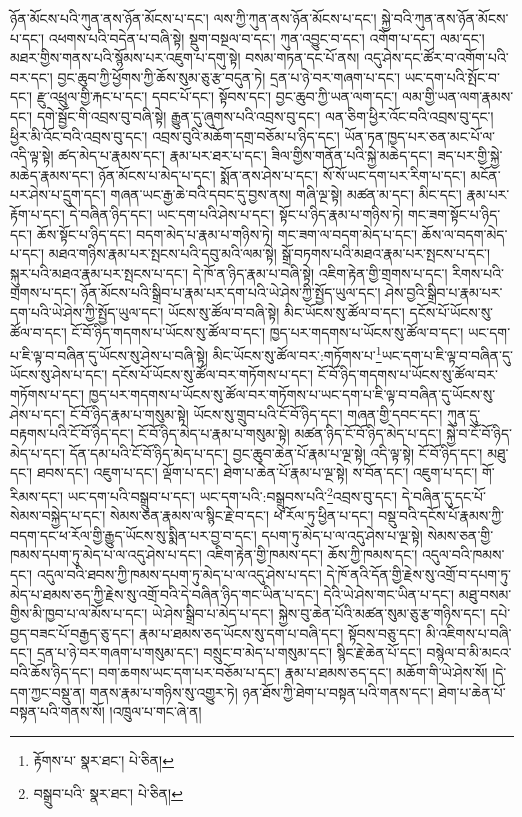 ཉོན་མོངས་པའི་ཀུན་ནས་ཉོན་མོངས་པ་དང་། ལས་ཀྱི་ཀུན་ནས་ཉོན་མོངས་པ་དང་། སྐྱེ་བའི་ཀུན་ནས་ཉོན་མོངས་པ་དང་། འཕགས་པའི་བདེན་པ་བཞི་སྟེ། སྡུག་བསྔལ་བ་དང་། ཀུན་འབྱུང་བ་དང་། འགོག་པ་དང་། ལམ་དང་། མཐར་གྱིས་གནས་པའི་སྙོམས་པར་འཇུག་པ་དགུ་སྟེ། བསམ་གཏན་དང་པོ་ནས། འདུ་ཤེས་དང་ཚོར་བ་འགོག་པའི་བར་དང་། བྱང་ཆུབ་ཀྱི་ཕྱོགས་ཀྱི་ཆོས་སུམ་ཅུ་རྩ་བདུན་ཏེ། དྲན་པ་ཉེ་བར་གཞག་པ་དང་། ཡང་དག་པའི་སྤོང་བ་དང་། རྫུ་འཕྲུལ་གྱི་རྐང་པ་དང་། དབང་པོ་དང་། སྟོབས་དང་། བྱང་ཆུབ་ཀྱི་ཡན་ལག་དང་། ལམ་གྱི་ཡན་ལག་རྣམས་དང་། དགེ་སྦྱོང་གི་འབྲས་བུ་བཞི་སྟེ། རྒྱུན་དུ་ཞུགས་པའི་འབྲས་བུ་དང་། ལན་ཅིག་ཕྱིར་འོང་བའི་འབྲས་བུ་དང་། ཕྱིར་མི་འོང་བའི་འབྲས་བུ་དང་། འབྲས་བུའི་མཆོག་དགྲ་བཅོམ་པ་ཉིད་དང་། ཡོན་ཏན་ཁྱད་པར་ཅན་མང་པོ་ལ་འདི་ལྟ་སྟེ། ཚད་མེད་པ་རྣམས་དང་། རྣམ་པར་ཐར་པ་དང་། ཟིལ་གྱིས་གནོན་པའི་སྐྱེ་མཆེད་དང་། ཟད་པར་གྱི་སྐྱེ་མཆེད་རྣམས་དང་། ཉོན་མོངས་པ་མེད་པ་དང་། སྨོན་ནས་ཤེས་པ་དང་། སོ་སོ་ཡང་དག་པར་རིག་པ་དང་། མངོན་པར་ཤེས་པ་དྲུག་དང་། གཞན་ཡང་རྒྱ་ཆེ་བའི་དབང་དུ་བྱས་ནས། གཞི་ལྔ་སྟེ། མཚན་མ་དང་། མིང་དང་། རྣམ་པར་རྟོག་པ་དང་། དེ་བཞིན་ཉིད་དང་། ཡང་དག་པའི་ཤེས་པ་དང་། སྟོང་པ་ཉིད་རྣམ་པ་གཉིས་ཏེ། གང་ཟག་སྟོང་པ་ཉིད་དང་། ཆོས་སྟོང་པ་ཉིད་དང་། བདག་མེད་པ་རྣམ་པ་གཉིས་ཏེ། གང་ཟག་ལ་བདག་མེད་པ་དང་། ཆོས་ལ་བདག་མེད་པ་དང་། མཐའ་གཉིས་རྣམ་པར་སྤངས་པའི་དབུ་མའི་ལམ་སྟེ། སྒྲོ་བཏགས་པའི་མཐའ་རྣམ་པར་སྤངས་པ་དང་། སྐུར་པའི་མཐའ་རྣམ་པར་སྤངས་པ་དང་། དེ་ཁོ་ན་ཉིད་རྣམ་པ་བཞི་སྟེ། འཇིག་རྟེན་གྱི་གྲགས་པ་དང་། རིགས་པའི་གྲགས་པ་དང་། ཉོན་མོངས་པའི་སྒྲིབ་པ་རྣམ་པར་དག་པའི་ཡེ་ཤེས་ཀྱི་སྤྱོད་ཡུལ་དང་། ཤེས་བྱའི་སྒྲིབ་པ་རྣམ་པར་དག་པའི་ཡེ་ཤེས་ཀྱི་སྤྱོད་ཡུལ་དང་། ཡོངས་སུ་ཚོལ་བ་བཞི་སྟེ། མིང་ཡོངས་སུ་ཚོལ་བ་དང་། དངོས་པོ་ཡོངས་སུ་ཚོལ་བ་དང་། ངོ་བོ་ཉིད་གདགས་པ་ཡོངས་སུ་ཚོལ་བ་དང་། ཁྱད་པར་གདགས་པ་ཡོངས་སུ་ཚོལ་བ་དང་། ཡང་དག་པ་ཇི་ལྟ་བ་བཞིན་དུ་ཡོངས་སུ་ཤེས་པ་བཞི་སྟེ། མིང་ཡོངས་སུ་ཚོལ་བར་:གཏོགས་པ་\footnote{རྟོགས་པ་  སྣར་ཐང་།  པེ་ཅིན། }ཡང་དག་པ་ཇི་ལྟ་བ་བཞིན་དུ་ཡོངས་སུ་ཤེས་པ་དང་། དངོས་པོ་ཡོངས་སུ་ཚོལ་བར་གཏོགས་པ་དང་། ངོ་བོ་ཉིད་གདགས་པ་ཡོངས་སུ་ཚོལ་བར་གཏོགས་པ་དང་། ཁྱད་པར་གདགས་པ་ཡོངས་སུ་ཚོལ་བར་གཏོགས་པ་ཡང་དག་པ་ཇི་ལྟ་བ་བཞིན་དུ་ཡོངས་སུ་ཤེས་པ་དང་། ངོ་བོ་ཉིད་རྣམ་པ་གསུམ་སྟེ། ཡོངས་སུ་གྲུབ་པའི་ངོ་བོ་ཉིད་དང་། གཞན་གྱི་དབང་དང་། ཀུན་དུ་བརྟགས་པའི་ངོ་བོ་ཉིད་དང་། ངོ་བོ་ཉིད་མེད་པ་རྣམ་པ་གསུམ་སྟེ། མཚན་ཉིད་ངོ་བོ་ཉིད་མེད་པ་དང་། སྐྱེ་བ་ངོ་བོ་ཉིད་མེད་པ་དང་། དོན་དམ་པའི་ངོ་བོ་ཉིད་མེད་པ་དང་། བྱང་ཆུབ་ཆེན་པོ་རྣམ་པ་ལྔ་སྟེ། འདི་ལྟ་སྟེ། ངོ་བོ་ཉིད་དང་། མཐུ་དང་། ཐབས་དང་། འཇུག་པ་དང་། ལྡོག་པ་དང་། ཐེག་པ་ཆེན་པོ་རྣམ་པ་ལྔ་སྟེ། ས་བོན་དང་། འཇུག་པ་དང་། གོ་རིམས་དང་། ཡང་དག་པའི་བསྒྲུབ་པ་དང་། ཡང་དག་པའི་:བསྒྲུབས་པའི་\footnote{བསྒྲུབ་པའི་  སྣར་ཐང་།  པེ་ཅིན། }འབྲས་བུ་དང་། དེ་བཞིན་དུ་དང་པོ་སེམས་བསྐྱེད་པ་དང་། སེམས་ཅན་རྣམས་ལ་སྙིང་རྗེ་བ་དང་། ཕ་རོལ་ཏུ་ཕྱིན་པ་དང་། བསྡུ་བའི་དངོས་པོ་རྣམས་ཀྱི་བདག་དང་ཕ་རོལ་གྱི་རྒྱུད་ཡོངས་སུ་སྨིན་པར་བྱ་བ་དང་། དཔག་ཏུ་མེད་པ་ལ་འདུ་ཤེས་པ་ལྔ་སྟེ། སེམས་ཅན་གྱི་ཁམས་དཔག་ཏུ་མེད་པ་ལ་འདུ་ཤེས་པ་དང་། འཇིག་རྟེན་གྱི་ཁམས་དང་། ཆོས་ཀྱི་ཁམས་དང་། འདུལ་བའི་ཁམས་དང་། འདུལ་བའི་ཐབས་ཀྱི་ཁམས་དཔག་ཏུ་མེད་པ་ལ་འདུ་ཤེས་པ་དང་། དེ་ཁོ་ནའི་དོན་གྱི་རྗེས་སུ་འགྲོ་བ་དཔག་ཏུ་མེད་པ་ཐམས་ཅད་ཀྱི་རྗེས་སུ་འགྲོ་བའི་དེ་བཞིན་ཉིད་གང་ཡིན་པ་དང་། དེའི་ཡེ་ཤེས་གང་ཡིན་པ་དང་། མཐུ་བསམ་གྱིས་མི་ཁྱབ་པ་ལ་མོས་པ་དང་། ཡེ་ཤེས་སྒྲིབ་པ་མེད་པ་དང་། སྐྱེས་བུ་ཆེན་པོའི་མཚན་སུམ་ཅུ་རྩ་གཉིས་དང་། དཔེ་བྱད་བཟང་པོ་བརྒྱད་ཅུ་དང་། རྣམ་པ་ཐམས་ཅད་ཡོངས་སུ་དག་པ་བཞི་དང་། སྟོབས་བཅུ་དང་། མི་འཇིགས་པ་བཞི་དང་། དྲན་པ་ཉེ་བར་གཞག་པ་གསུམ་དང་། བསྲུང་བ་མེད་པ་གསུམ་དང་། སྙིང་རྗེ་ཆེན་པོ་དང་། བསྙེལ་བ་མི་མངའ་བའི་ཆོས་ཉིད་དང་། བག་ཆགས་ཡང་དག་པར་བཅོམ་པ་དང་། རྣམ་པ་ཐམས་ཅད་དང་། མཆོག་གི་ཡེ་ཤེས་སོ། །དེ་དག་ཀྱང་བསྡུ་ན། གནས་རྣམ་པ་གཉིས་སུ་འགྱུར་ཏེ། ཉན་ཐོས་ཀྱི་ཐེག་པ་བསྟན་པའི་གནས་དང་། ཐེག་པ་ཆེན་པོ་བསྟན་པའི་གནས་སོ། །འཁྲུལ་པ་གང་ཞེ་ན། 